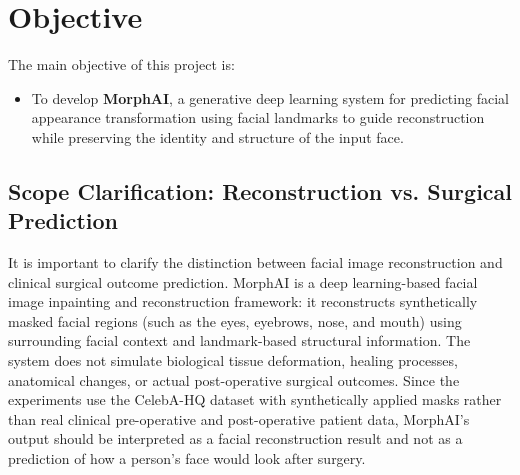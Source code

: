 
\section{Objective}

The main objective of this project is:

\begin{itemize}
\item To develop \textbf{MorphAI}, a generative deep learning system for predicting facial appearance transformation using facial landmarks to guide reconstruction while preserving the identity and structure of the input face.
\end{itemize}

\clearpage
\subsection*{Scope Clarification: Reconstruction vs. Surgical Prediction}
It is important to clarify the distinction between facial image reconstruction and 
clinical surgical outcome prediction. MorphAI is a deep learning-based facial image 
inpainting and reconstruction framework: it reconstructs synthetically masked facial 
regions (such as the eyes, eyebrows, nose, and mouth) using surrounding facial context 
and landmark-based structural information. The system does not simulate biological 
tissue deformation, healing processes, anatomical changes, or actual post-operative 
surgical outcomes. Since the experiments use the CelebA-HQ dataset with synthetically applied masks rather than real clinical pre-operative and post-operative patient data, MorphAI's output should be interpreted as a facial reconstruction result and not as a prediction of how a person's face would look after surgery.

